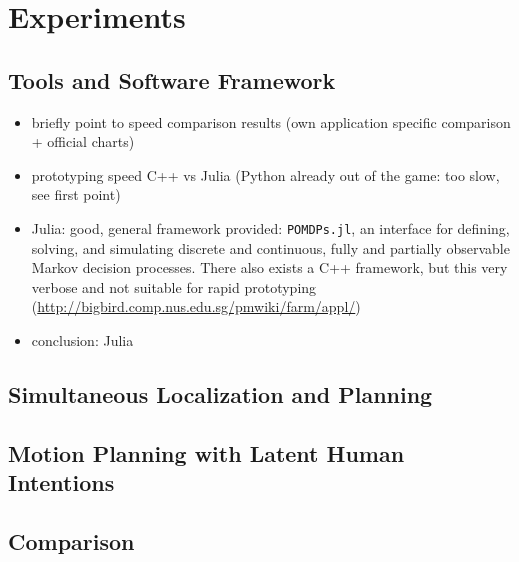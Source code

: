 \chapter{Experiments}\label{chap:experiments}

\section{Tools and Software Framework}

\begin{itemize}
  \item briefly point to speed comparison results (own application specific comparison + official charts)
  \item prototyping speed C++ vs Julia (Python already out of the game: too slow, see first point)
  \item Julia: good, general framework provided: \texttt{POMDPs.jl}, an interface for
  defining, solving, and simulating discrete and continuous, fully and
  partially observable Markov decision processes.  \cite{egorov2017pomdps}
  There also exists a C++ framework, but this very verbose and not suitable for
  rapid prototyping (\url{http://bigbird.comp.nus.edu.sg/pmwiki/farm/appl/})
  \item conclusion: Julia \cite{bezanson2017julia}
\end{itemize}

\section{Simultaneous Localization and Planning}

\section{Motion Planning with Latent Human Intentions}

\section{Comparison}


